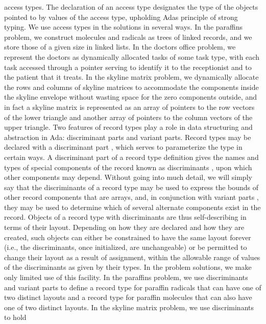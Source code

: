 \txtxemph[]access types\txtxendemph[]. The declaration of an access
type designates the type of the objects pointed to by values of the
access type, upholding Ada\rsquo[]s principle of strong typing. We
use access types in the solutions in several ways. In the paraffins
problem, we construct molecules and radicals as trees of linked records,
and we store those of a given size in linked lists. In the doctor\rsquo[]s
office problem, we represent the doctors as dynamically allocated
tasks of some task type, with each task accessed through a pointer
serving to identify it to the receptionist and to the patient that
it treats. In the skyline matrix problem, we dynamically allocate
the rows and columns of skyline matrices to accommodate the components
inside the skyline envelope without wasting space for the zero components
outside, and in fact a skyline matrix is represented as an array of
pointers to the row vectors of the lower triangle and another array
of pointers to the column vectors of the upper triangle.%
\Endpara[]
\Para[]Two features of record types play a role in data structuring
and abstraction in Ada: discriminant parts and variant parts. Record
types may be declared with a \txtxemph[]discriminant part%
\txtxendemph[], which serves to parameterize the type in certain ways.
A discriminant part of a record type definition gives the names and
types of special components of the record known as \txtxemph[]discriminants%
\txtxendemph[], upon which other components may depend. Without going
into much detail, we will simply say that the discriminants of a record
type may be used to express the bounds of other record components
that are arrays, and, in conjunction with \txtxemph[]variant parts%
\txtxendemph[], they may be used to determine which of several alternate
components exist in the record. Objects of a record type with discriminants
are thus self-describing in terms of their layout. Depending on how
they are declared and how they are created, such objects can either
be constrained to have the same layout forever (i.e., the discriminants,
once initialized, are unchangeable) or be permitted to change their
layout as a result of assignment, within the allowable range of values
of the discriminants as given by their types. In the problem solutions,
we make only limited use of this facility. In the paraffins problem,
we use discriminants and variant parts to define a record type for
paraffin radicals that can have one of two distinct layouts and a
record type for paraffin molecules that can also have one of two distinct
layouts. In the skyline matrix problem, we use discriminants to hold
